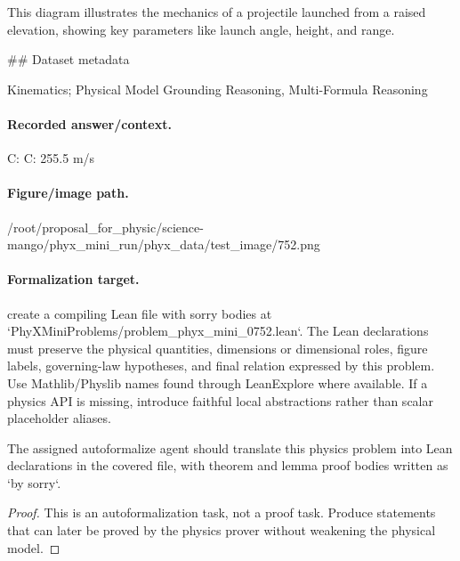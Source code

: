 This diagram illustrates the mechanics of a projectile launched from a raised elevation, showing key parameters like launch angle, height, and range.

\#\# Dataset metadata

Kinematics; Physical Model Grounding Reasoning, Multi-Formula Reasoning

\paragraph{Recorded answer/context.}
C: C: 255.5 m/s

\paragraph{Figure/image path.}
/root/proposal\_for\_physic/science-mango/phyx\_mini\_run/phyx\_data/test\_image/752.png

\paragraph{Formalization target.}
create a compiling Lean file with sorry bodies at `PhyXMiniProblems/problem\_phyx\_mini\_0752.lean`. The Lean declarations must preserve the physical quantities, dimensions or dimensional roles, figure labels, governing-law hypotheses, and final relation expressed by this problem.
Use Mathlib/Physlib names found through LeanExplore where available. If a physics API is missing, introduce faithful local abstractions rather than scalar placeholder aliases.

\begin{theorem}
\label{thm:physics:phyx_mini_0752:target}
The assigned autoformalize agent should translate this physics problem into Lean declarations in the covered file, with theorem and lemma proof bodies written as `by sorry`.
\end{theorem}
\begin{proof}
This is an autoformalization task, not a proof task. Produce statements that can later be proved by the physics prover without weakening the physical model.
\end{proof}

